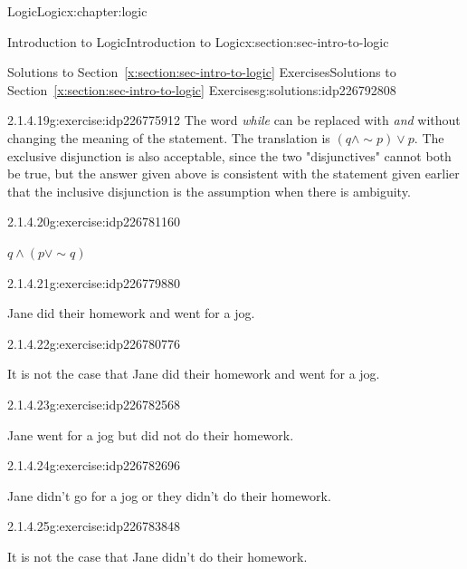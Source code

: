 \documentclass[twoside,10pt,]{book}
\newcommand{\xreffont}{\relax}
\numberwithin{equation}{section}
\begin{document}
\begin{chapterptx}{Logic}{}{Logic}{}{}{x:chapter:logic}
\begin{sectionptx}{Introduction to Logic}{}{Introduction to Logic}{}{}{x:section:sec-intro-to-logic}
\begin{solutions-subsection}{Solutions to Section~{\xreffont\ref*{x:section:sec-intro-to-logic}} Exercises}{}{Solutions to Section~{\xreffont\ref*{x:section:sec-intro-to-logic}} Exercises}{}{}{g:solutions:idp226792808}
\begin{exercisegroup}
\begin{divisionsolutioneg}{2.1.4.19}{}{g:exercise:idp226775912}
\noindent\hypertarget{g:solution:idp226774376-main}{}The word \emph{while} can be replaced with \emph{and} without changing the meaning of the statement. The translation is \((q{\wedge} \sim\!{p}){\vee} p\).  The exclusive disjunction is also acceptable, since the two "disjunctives" cannot both be true, but the answer given above is consistent with the statement given earlier that the inclusive disjunction is the assumption when there is ambiguity.\end{divisionsolutioneg}%
\begin{divisionsolutioneg}{2.1.4.20}{}{g:exercise:idp226781160}%
\par\smallskip%
\noindent\hypertarget{g:solution:idp226781672-main}{}\(q{\wedge} (p{\vee}\sim\!{q})\)\end{divisionsolutioneg}%
\end{exercisegroup}
\par\medskip\noindent
\begin{exercisegroup}
\begin{divisionsolutioneg}{2.1.4.21}{}{g:exercise:idp226779880}%
\par\smallskip%
\noindent\hypertarget{g:solution:idp226778216-main}{}Jane did their homework and went for a jog.\end{divisionsolutioneg}%
\begin{divisionsolutioneg}{2.1.4.22}{}{g:exercise:idp226780776}%
\par\smallskip%
\noindent\hypertarget{g:solution:idp226779368-main}{}It is not the case that Jane did their homework and went for a jog.\end{divisionsolutioneg}%
\begin{divisionsolutioneg}{2.1.4.23}{}{g:exercise:idp226782568}%
\par\smallskip%
\noindent\hypertarget{g:solution:idp226781544-main}{}Jane went for a jog but did not do their homework.\end{divisionsolutioneg}%
\begin{divisionsolutioneg}{2.1.4.24}{}{g:exercise:idp226782696}%
\par\smallskip%
\noindent\hypertarget{g:solution:idp226782824-main}{}Jane didn't go for a jog or they didn't do their homework.\end{divisionsolutioneg}%
\begin{divisionsolutioneg}{2.1.4.25}{}{g:exercise:idp226783848}%
\par\smallskip%
\noindent\hypertarget{g:solution:idp226784360-main}{}It is not the case that Jane didn't do their homework.\end{divisionsolutioneg}%

\end{exercisegroup}
\end{solutions-subsection}
\end{sectionptx}
\end{chapterptx}
\end{document}
